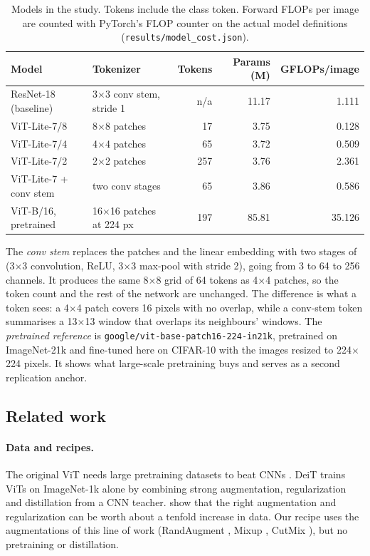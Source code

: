 \documentclass[11pt]{article}
\newcommand{\file}[1]{\nolinkurl{#1}}
\begin{document}
\begin{table}[htbp]
\centering
\small
\caption{Models in the study. Tokens include the class token. Forward FLOPs per image are counted with PyTorch's FLOP counter on the actual model definitions (\file{results/model_cost.json}).}
\label{tab:models}
\begin{tabular}{@{}llrrr@{}}
\toprule
Model & Tokenizer & Tokens & Params (M) & GFLOPs/image \\
\midrule
ResNet-18 (baseline) & 3$\times$3 conv stem, stride 1 & n/a & 11.17 & 1.111 \\
ViT-Lite-7/8 & 8$\times$8 patches & 17 & 3.75 & 0.128 \\
ViT-Lite-7/4 & 4$\times$4 patches & 65 & 3.72 & 0.509 \\
ViT-Lite-7/2 & 2$\times$2 patches & 257 & 3.76 & 2.361 \\
ViT-Lite-7 + conv stem & two conv stages & 65 & 3.86 & 0.586 \\
ViT-B/16, pretrained & 16$\times$16 patches at 224 px & 197 & 85.81 & 35.126 \\
\bottomrule
\end{tabular}
\end{table}

The \emph{conv stem} replaces the patches and the linear embedding with two stages of (3$\times$3 convolution, ReLU, 3$\times$3 max-pool with stride 2), going from 3 to 64 to 256 channels. It produces the same 8$\times$8 grid of 64 tokens as 4$\times$4 patches, so the token count and the rest of the network are unchanged. The difference is what a token sees: a 4$\times$4 patch covers 16 pixels with no overlap, while a conv-stem token summarises a 13$\times$13 window that overlaps its neighbours' windows. The \emph{pretrained reference} is \file{google/vit-base-patch16-224-in21k}, pretrained on ImageNet-21k and fine-tuned here on CIFAR-10 with the images resized to 224$\times$224 pixels. It shows what large-scale pretraining buys and serves as a second replication anchor.

\subsection{Related work}

\paragraph{Data and recipes.} The original ViT needs large pretraining datasets to beat CNNs \citep{dosovitskiy2021vit}. DeiT \citep{touvron2021deit} trains ViTs on ImageNet-1k alone by combining strong augmentation, regularization and distillation from a CNN teacher. \citet{steiner2022augreg} show that the right augmentation and regularization can be worth about a tenfold increase in data. Our recipe uses the augmentations of this line of work (RandAugment \citep{cubuk2020randaugment}, Mixup \citep{zhang2018mixup}, CutMix \citep{yun2019cutmix}), but no pretraining or distillation.
\end{document}
